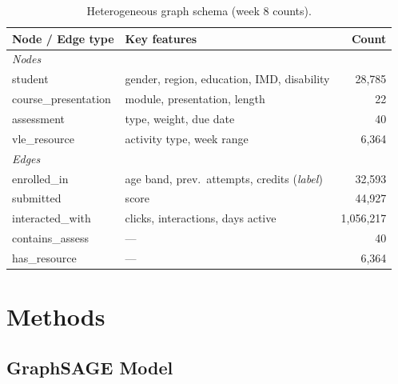 \documentclass[sigconf,review]{acmart}
\begin{document}
\begin{table}[t]
  \centering
  \caption{Heterogeneous graph schema (week 8 counts).}
  \label{tab:schema}
  \small
  \begin{tabular}{llr}
    \toprule
    \textbf{Node / Edge type} & \textbf{Key features} & \textbf{Count} \\
    \midrule
    \multicolumn{3}{l}{\textit{Nodes}} \\
    \quad student          & gender, region, education, IMD, disability & 28,785 \\
    \quad course\_presentation & module, presentation, length        & 22     \\
    \quad assessment       & type, weight, due date                    & 40     \\
    \quad vle\_resource    & activity type, week range                 & 6,364  \\
    \midrule
    \multicolumn{3}{l}{\textit{Edges}} \\
    \quad enrolled\_in     & age band, prev.\ attempts, credits (\emph{label}) & 32,593 \\
    \quad submitted        & score                                     & 44,927 \\
    \quad interacted\_with & clicks, interactions, days active         & 1,056,217 \\
    \quad contains\_assess & ---                                       & 40     \\
    \quad has\_resource    & ---                                       & 6,364  \\
    \bottomrule
  \end{tabular}
\end{table}

\section{Methods}
\label{sec:methods}

\subsection{GraphSAGE Model}
\label{sec:gnn}
\end{document}
